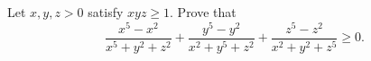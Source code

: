 Let $x,y,z > 0$ satisfy $xyz\geq 1$. Prove that
\[ \frac { x^5-x^2 }{x^5+y^2+z^2}
  + \frac {y^5-y^2}{x^2+y^5+z^2}
  + \frac {z^5-z^2}{x^2+y^2+z^5} \geq 0. \]